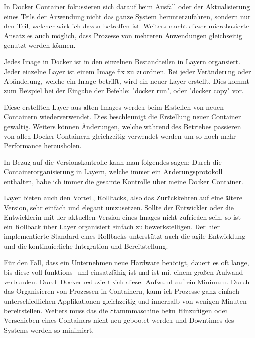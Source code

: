 

In Docker Container fokussieren sich darauf beim Ausfall oder der Aktualisierung eines Teils der Anwendung nicht das ganze System herunterzufahren, sondern nur den Teil, welcher wirklich davon betroffen ist. Weiters macht dieser microbasierte Ansatz es auch möglich, dass Prozesse von mehreren Anwendungen gleichzeitig genutzt werden können. \cite{DockerGrundlagen}


Jedes Image in Docker ist in den einzelnen Bestandteilen in Layern organsiert. Jeder einzelne Layer ist einem Image fix zu zuordnen. Bei jeder Veränderung oder Abänderung, welche ein Image betrifft, wird ein neuer Layer erstellt. Dies kommt zum Beispiel bei der Eingabe der Befehle: "docker run", oder "docker copy" vor. \cite{DockerGrundlagen}

Diese erstellten Layer aus alten Images werden beim Erstellen von neuen Containern wiederverwendet. Dies beschleunigt die Erstellung neuer Container gewaltig. Weiters können Änderungen, welche während des Betriebes passieren von allen Docker Containern gleichzeitig verwendet werden um so noch mehr Performance herausholen. \cite{DockerGrundlagen}

In Bezug auf die Versionskontrolle kann man folgendes sagen: Durch die Containerorganisierung in Layern, welche immer ein Änderungsprotokoll enthalten, habe ich immer die gesamte Kontrolle über meine Docker Container. \cite{DockerGrundlagen}


Layer bieten auch den Vorteil, Rollbacks, also das Zurückkehren auf eine ältere Version, sehr einfach und elegant umzusetzen. Sollte der Entwickler oder die Entwicklerin mit der aktuellen Version eines Images nicht zufrieden sein, so ist ein Rollback über Layer organisiert einfach zu bewerkstelligen. Der hier implementierte Standard eines Rollbacks unterstützt auch die agile Entwicklung und die kontinuierliche Integration und Bereitstellung. \cite{DockerGrundlagen}


Für den Fall, dass ein Unternehmen neue Hardware benötigt, dauert es oft lange, bis diese voll funktions- und einsatzfähig ist und ist mit einem großen Aufwand verbunden. Durch Docker reduziert sich dieser Aufwand auf ein Minimum. Durch das Organisieren von Prozessen in Containern, kann ich Prozesse ganz einfach unterschiedlichen Applikationen gleichzeitig und innerhalb von wenigen Minuten bereitstellen. Weiters muss das die Stammmaschine beim Hinzufügen oder Verschieben eines Containers nicht neu gebootet werden und Downtimes des Systems werden so minimiert. \cite{DockerGrundlagen}
